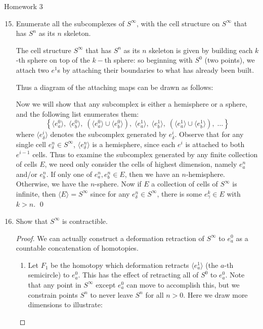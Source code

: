 \documentclass[12pt,letterpaper]{article}
\begin{document}
\pagestyle{fancy}
\begin{center}
{\Large Homework 3}%
\end{center}

\begin{enumerate}
\setcounter{enumi}{14}
\item Enumerate all the subcomplexes of $S^\infty$, with the cell structure on $S^\infty$ that has $S^n$ as its $n$ skeleton.

\answer The cell structure $S^\infty$ that has $S^n$ as its $n$ skeleton is given by building each $k$-th sphere on top of the $k-$th sphere: so beginning with $S^0$ (two points), we attach two $e^1$s by attaching their boundaries to what has already been built. 

Thus a diagram of the attaching maps can be drawn as follows:

Now we will show that any subcomplex is either a hemisphere or a sphere, and the following list enumerates them:
$$\left\lbrace 
\langle{e^0_a}\rangle,\; \langle{e^0_b}\rangle,\; \left(\langle{e^0_a}\rangle \cup \langle{e^0_b}\rangle\right),\;
\langle{e^1_a}\rangle,\; \langle{e^1_b}\rangle,\; \left(\langle{e^1_a}\rangle \cup \langle{e^1_b}\rangle\right),\; \dots
\right\rbrace$$
where $\langle e^i_\delta \rangle$ denotes the subcomplex generated by $e^i_\delta$. Observe that for any single cell $e^n_\delta\in S^\infty$, $\langle e^n_\delta \rangle$ is a hemisphere, since each $e^i$ is attached to both $e^{i-1}$ cells. 
Thus to examine the subcomplex generated by any finite collection of cells $E$, we need only consider the cells of highest dimension, namely $e^n_a$ and/or $e^n_b$. 
If only one of $e^n_a, e^n_b\in E$, then we have an $n$-hemisphere. Otherwise, we have the $n$-sphere. 
Now if $E$ a collection of cells of $S^\infty$ is infinite, then $\langle E\rangle = S^\infty$ since for any $e^n_\delta\in S^\infty$, there is some $e^k_\gamma\in E$ with $k>n$. \qed

\pagebreak
\item Show that $S^\infty$ is contractible. 
\begin{proof}
We can actually construct a deformation retraction of $S^\infty$ to $e^0_a$ as a countable concatenation of homotopies. 
	\begin{enumerate}[label=(\arabic*)]
	\item Let $F_1$ be the homotopy which deformation retracts $\langle e^1_a \rangle$ (the $a$-th semicircle) to $e^0_a$. This has the effect of retracting all of $S^0$ to $e^0_a$. 
Note that any point in $S^\infty$ except $e^0_a$ can move to accomplish this, but we constrain points  $S^n$ to never leave $S^n$ for all $n>0$. Here we draw more dimensions to illustrate:


\end{enumerate}
\end{proof}
\end{enumerate}
\end{document}
